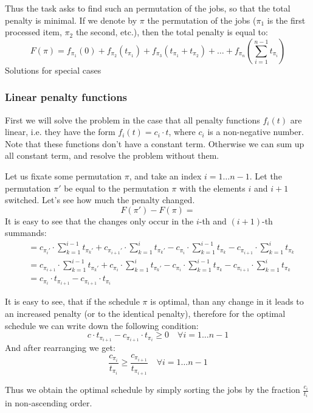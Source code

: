 \documentclass[8pt, a4paper, oneside, twocolumn]{extarticle}
\begin{document}
Thus the task asks to find such an permutation of the jobs, so that the total penalty is minimal. If we denote by $\pi$ the permutation of the jobs ($\pi_1$ is the first processed item, $\pi_2$ the second, etc.), then the total penalty is equal to: $$F(\pi) = f_{\pi_1}(0) + f_{\pi_2}(t_{\pi_1}) + f_{\pi_3}(t_{\pi_1} + t_{\pi_2}) + \dots + f_{\pi_n}\left(\sum_{i=1}^{n-1} t_{\pi_i}\right)$$
Solutions for special cases
\subsubsection{Linear penalty functions}

First we will solve the problem in the case that all penalty functions $f_i(t)$ are linear, i.e. they have the form $f_i(t) = c_i \cdot t$, where $c_i$ is a non-negative number. Note that these functions don't have a constant term. Otherwise we can sum up all constant term, and resolve the problem without them.

Let us fixate some permutation $\pi$, and take an index $i = 1 \dots n-1$. Let the permutation $\pi'$ be equal to the permutation $\pi$ with the elements $i$ and $i+1$ switched. Let's see how much the penalty changed. $$F(\pi') - F(\pi) =$$ It is easy to see that the changes only occur in the $i$-th and $(i+1)$-th summands: 
\begin{eqnarray} 
&= c_{\pi_i'} \cdot \sum_{k = 1}^{i-1} t_{\pi_k'} + c_{\pi_{i+1}'} \cdot \sum_{k = 1}^i t_{\pi_k'} - c_{\pi_i} \cdot \sum_{k = 1}^{i-1} t_{\pi_k} - c_{\pi_{i+1}} \cdot \sum_{k = 1}^i t_{\pi_k} \\ &= c_{\pi_{i+1}} \cdot \sum_{k = 1}^{i-1} t_{\pi_k'} + c_{\pi_i} \cdot \sum_{k = 1}^i t_{\pi_k'} - c_{\pi_i} \cdot \sum_{k = 1}^{i-1} t_{\pi_k} - c_{\pi_{i+1}} \cdot \sum_{k = 1}^i t_{\pi_k} \\ &= c_{\pi_i} \cdot t_{\pi_{i+1}} - c_{\pi_{i+1}} \cdot t_{\pi_i} 
\end{eqnarray}

It is easy to see, that if the schedule $\pi$ is optimal, than any change in it leads to an increased penalty (or to the identical penalty), therefore for the optimal schedule we can write down the following condition: $$c \cdot t_{\pi_{i+1}} - c_{\pi_{i+1}} \cdot t_{\pi_i} \ge 0 \quad \forall i = 1 \dots n-1$$ And after rearranging we get: $$\frac{c_{\pi_i}}{t_{\pi_i}} \ge \frac{c_{\pi_{i+1}}}{t_{\pi_{i+1}}} \quad \forall i = 1 \dots n-1$$

Thus we obtain the optimal schedule by simply sorting the jobs by the fraction $\frac{c_i}{t_i}$ in non-ascending order.
\end{document}
